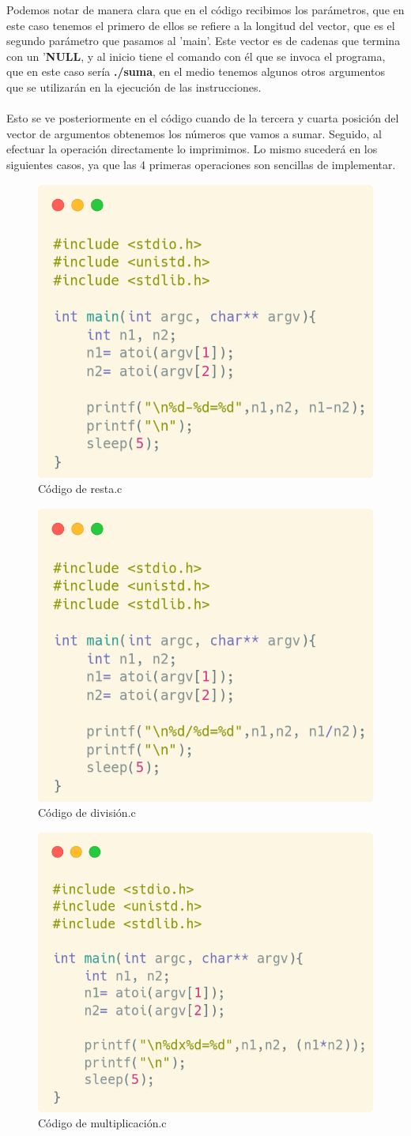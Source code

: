 \documentclass[11pt]{article}
\begin{document}
	Podemos notar de manera clara que en el código recibimos los parámetros, que en este caso tenemos el primero de ellos se refiere a la longitud del vector, que es el segundo parámetro que pasamos al 'main'. Este vector es de cadenas que termina con un '\textbf{NULL}, y al inicio tiene el comando con él que se invoca el programa, que en este caso sería \textbf{./suma}, en el medio tenemos algunos otros argumentos que se utilizarán en la ejecución de las instrucciones. 
	\\\\ 
	Esto se ve posteriormente en el código cuando de la tercera y cuarta posición del vector de argumentos obtenemos los números que vamos a sumar. Seguido, al efectuar la operación directamente lo imprimimos. Lo mismo sucederá en los siguientes casos, ya que las 4 primeras operaciones son sencillas de implementar. 
	\begin{figure}[h!]
		\centering
		\includegraphics[width=0.5\linewidth]{resta.png}
		\caption{Código de resta.c}
		\label{fig:resta}
	\end{figure}
	\begin{figure}[h!]
		\centering
		\includegraphics[width=0.5\linewidth]{division.png}
		\caption{Código de división.c}
		\label{fig:divsion}
	\end{figure}
	\begin{figure}[h!]
		\centering
		\includegraphics[width=0.5\linewidth]{multiplicacion.png}
		\caption{Código de multiplicación.c}
		\label{fig:multiplicacion}
	\end{figure}
	
\end{document}
